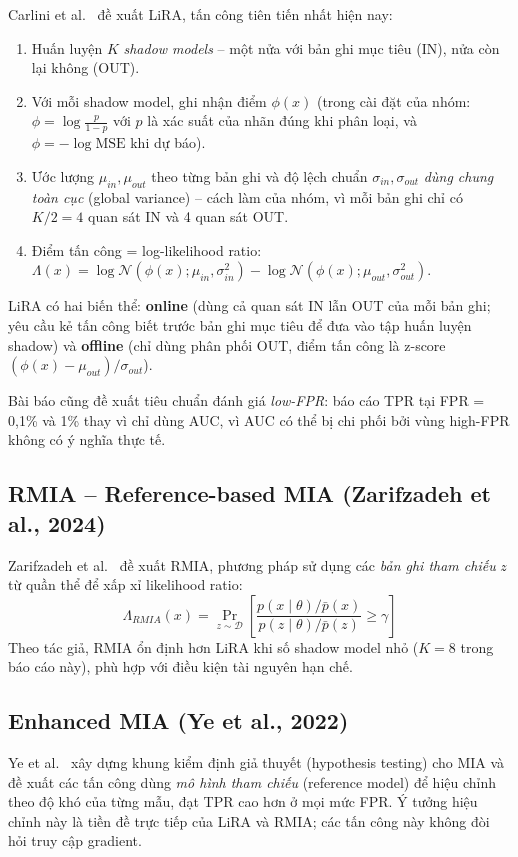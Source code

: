 \documentclass[12pt,a4paper]{report}
\begin{document}
Carlini et al.\ \cite{carlini2022} đề xuất LiRA, tấn công tiên tiến nhất hiện nay:
\begin{enumerate}
  \item Huấn luyện $K$ \textit{shadow models} -- một nửa với bản ghi mục tiêu (IN), nửa còn lại không (OUT).
  \item Với mỗi shadow model, ghi nhận điểm $\phi(x)$ (trong cài đặt của nhóm: $\phi = \log\frac{p}{1-p}$ với $p$ là xác suất của nhãn đúng khi phân loại, và $\phi = -\log \mathrm{MSE}$ khi dự báo).
  \item Ước lượng $\mu_{in}, \mu_{out}$ theo từng bản ghi và độ lệch chuẩn $\sigma_{in}, \sigma_{out}$ \textit{dùng chung toàn cục} (global variance) -- cách làm của nhóm, vì mỗi bản ghi chỉ có $K/2 = 4$ quan sát IN và 4 quan sát OUT.
  \item Điểm tấn công = log-likelihood ratio: $\Lambda(x) = \log \mathcal{N}(\phi(x); \mu_{in}, \sigma_{in}^2) - \log \mathcal{N}(\phi(x); \mu_{out}, \sigma_{out}^2)$.
\end{enumerate}
LiRA có hai biến thể: \textbf{online} (dùng cả quan sát IN lẫn OUT của mỗi bản ghi; yêu cầu kẻ tấn công biết trước bản ghi mục tiêu để đưa vào tập huấn luyện shadow) và \textbf{offline} (chỉ dùng phân phối OUT, điểm tấn công là z-score $(\phi(x) - \mu_{out})/\sigma_{out}$).

Bài báo cũng đề xuất tiêu chuẩn đánh giá \textit{low-FPR}: báo cáo TPR tại FPR = 0,1\% và 1\% thay vì chỉ dùng AUC, vì AUC có thể bị chi phối bởi vùng high-FPR không có ý nghĩa thực tế.

\subsection{RMIA -- Reference-based MIA (Zarifzadeh et al., 2024)}

Zarifzadeh et al.\ \cite{zarifzadeh2024} đề xuất RMIA, phương pháp sử dụng các \textit{bản ghi tham chiếu} $z$ từ quần thể để xấp xỉ likelihood ratio:
\[
  \Lambda_{RMIA}(x) = \Pr_{z \sim \mathcal{D}}\!\left[\frac{p(x \mid \theta)/\bar{p}(x)}{p(z \mid \theta)/\bar{p}(z)} \ge \gamma\right]
\]
Theo tác giả, RMIA ổn định hơn LiRA khi số shadow model nhỏ ($K = 8$ trong báo cáo này), phù hợp với điều kiện tài nguyên hạn chế.

\subsection{Enhanced MIA (Ye et al., 2022)}

Ye et al.\ \cite{ye2022} xây dựng khung kiểm định giả thuyết (hypothesis testing) cho MIA và đề xuất các tấn công dùng \textit{mô hình tham chiếu} (reference model) để hiệu chỉnh theo độ khó của từng mẫu, đạt TPR cao hơn ở mọi mức FPR. Ý tưởng hiệu chỉnh này là tiền đề trực tiếp của LiRA và RMIA; các tấn công này không đòi hỏi truy cập gradient.
\end{document}

